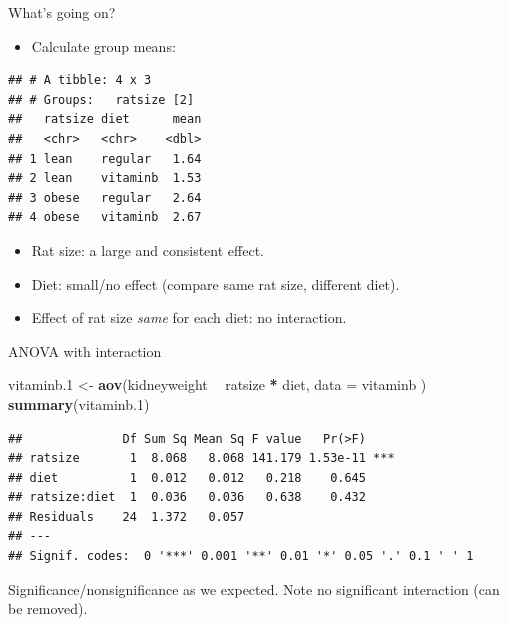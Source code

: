 \documentclass[ignorenonframetext,]{beamer}
\newenvironment{Shaded}{\begin{snugshade}}{\end{snugshade}}
\newcommand{\DataTypeTok}[1]{\textcolor[rgb]{0.13,0.29,0.53}{#1}}
\newcommand{\FloatTok}[1]{\textcolor[rgb]{0.00,0.00,0.81}{#1}}
\newcommand{\KeywordTok}[1]{\textcolor[rgb]{0.13,0.29,0.53}{\textbf{#1}}}
\newcommand{\NormalTok}[1]{#1}
\newcommand{\OperatorTok}[1]{\textcolor[rgb]{0.81,0.36,0.00}{\textbf{#1}}}
\newcommand{\StringTok}[1]{\textcolor[rgb]{0.31,0.60,0.02}{#1}}
\providecommand{\tightlist}{%
  \setlength{\itemsep}{0pt}\setlength{\parskip}{0pt}}
\begin{document}
\begin{frame}[fragile]{What's going on?}
\protect\hypertarget{whats-going-on}{}

\begin{itemize}
\tightlist
\item
  Calculate group means:
\end{itemize}

\begin{Shaded}
\end{Shaded}

\begin{verbatim}
## # A tibble: 4 x 3
## # Groups:   ratsize [2]
##   ratsize diet      mean
##   <chr>   <chr>    <dbl>
## 1 lean    regular   1.64
## 2 lean    vitaminb  1.53
## 3 obese   regular   2.64
## 4 obese   vitaminb  2.67
\end{verbatim}

\begin{itemize}
\item
  Rat size: a large and consistent effect.
\item
  Diet: small/no effect (compare same rat size, different diet).
\item
  Effect of rat size \emph{same} for each diet: no interaction.
\end{itemize}

\end{frame}

\begin{frame}[fragile]{ANOVA with interaction}
\protect\hypertarget{anova-with-interaction}{}

\begin{Shaded}
\begin{Highlighting}[]
\NormalTok{vitaminb}\FloatTok{.1}\NormalTok{ <-}\StringTok{ }\KeywordTok{aov}\NormalTok{(kidneyweight }\OperatorTok{~}\StringTok{ }\NormalTok{ratsize }\OperatorTok{*}\StringTok{ }\NormalTok{diet,}
  \DataTypeTok{data =}\NormalTok{ vitaminb}
\NormalTok{)}
\KeywordTok{summary}\NormalTok{(vitaminb}\FloatTok{.1}\NormalTok{)}
\end{Highlighting}
\end{Shaded}

\begin{verbatim}
##              Df Sum Sq Mean Sq F value   Pr(>F)    
## ratsize       1  8.068   8.068 141.179 1.53e-11 ***
## diet          1  0.012   0.012   0.218    0.645    
## ratsize:diet  1  0.036   0.036   0.638    0.432    
## Residuals    24  1.372   0.057                     
## ---
## Signif. codes:  0 '***' 0.001 '**' 0.01 '*' 0.05 '.' 0.1 ' ' 1
\end{verbatim}

Significance/nonsignificance as we expected. Note no significant
interaction (can be removed).

\end{frame}
\end{document}
